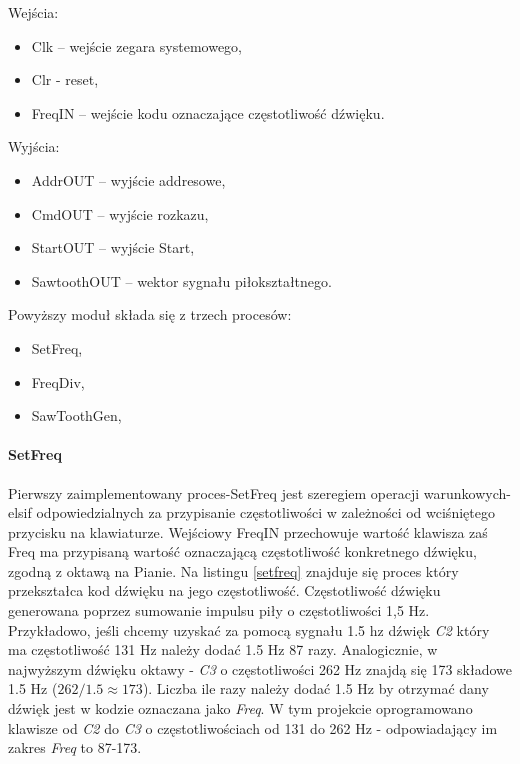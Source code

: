 \documentclass[11pt]{report}
\begin{document}
    \vspace{10mm} 
	Wejścia:
	\begin{itemize}
	\item Clk – wejście zegara systemowego,
	\item Clr - reset,
	\item FreqIN – wejście kodu oznaczające częstotliwość dźwięku.
	\end{itemize}
	
    \vspace{10mm} 
	Wyjścia:
	\begin{itemize}
	\item AddrOUT – wyjście addresowe,
	\item CmdOUT – wyjście rozkazu,
	\item StartOUT – wyjście Start,
	\item SawtoothOUT – wektor sygnału piłokształtnego.
	\end{itemize}
	
	Powyższy moduł składa się z trzech procesów:
    \begin{itemize}
	\item SetFreq, 
	\item FreqDiv,
	\item SawToothGen,
	\end{itemize}
	\newpage
	
	\paragraph{SetFreq} 
	Pierwszy zaimplementowany proces-SetFreq jest szeregiem operacji warunkowych-elsif odpowiedzialnych za przypisanie częstotliwości w zależności od wciśniętego przycisku na klawiaturze. Wejściowy FreqIN przechowuje wartość klawisza zaś Freq ma przypisaną wartość oznaczającą częstotliwość konkretnego dźwięku, zgodną z oktawą na Pianie. \cite{4}
    Na listingu \ref{setfreq} znajduje się proces który przekształca kod dźwięku na jego częstotliwość. Częstotliwość dźwięku generowana poprzez sumowanie impulsu piły o częstotliwości 1,5 Hz.  Przykładowo, jeśli chcemy uzyskać za pomocą sygnału 1.5 hz dźwięk \textit{C2} który ma częstotliwość 131 Hz należy dodać 1.5 Hz 87 razy. Analogicznie, w najwyższym dźwięku oktawy - \textit{C3} o częstotliwości 262 Hz znajdą się 173 składowe 1.5 Hz ($262/1.5\approx173$). Liczba ile razy należy dodać 1.5 Hz by otrzymać dany dźwięk jest w kodzie oznaczana jako \textit{Freq}. W tym projekcie oprogramowano klawisze od \textit{C2} do \textit{C3} o częstotliwościach od 131 do 262 Hz - odpowiadający im zakres \textit{Freq} to 87-173.
    
\end{document}
